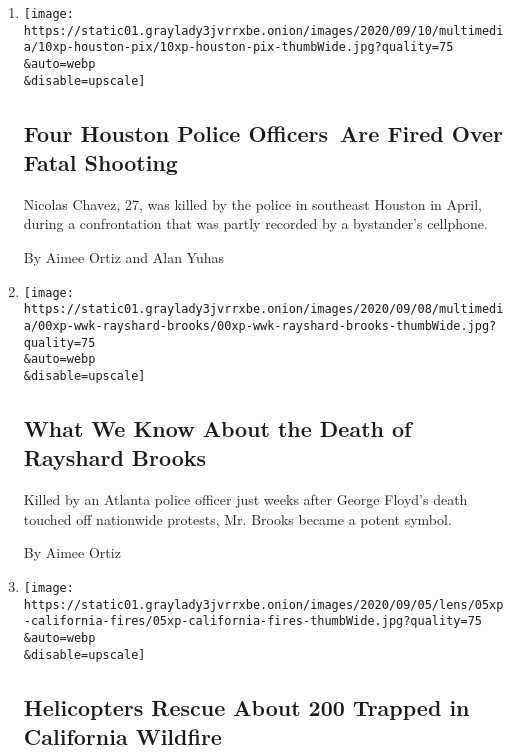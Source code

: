 \begin{enumerate}
\def\labelenumi{\arabic{enumi}.}
\item
  \href{/2020/09/10/us/nicholas-chavez-houston-police.html}{}

  \texttt{[image: https://static01.graylady3jvrrxbe.onion/images/2020/09/10/multimedia/10xp-houston-pix/10xp-houston-pix-thumbWide.jpg?quality=75\\\&auto=webp\\\&disable=upscale]}

  \hypertarget{four-houston-police-officers-are-fired-over-fatal-shooting}{%
  \subsection{Four Houston Police Officers~Are Fired Over Fatal
  Shooting}\label{four-houston-police-officers-are-fired-over-fatal-shooting}}

  Nicolas Chavez, 27, was killed by the police in southeast Houston in
  April, during a confrontation that was partly recorded by a
  bystander's cellphone.

  By Aimee Ortiz and Alan Yuhas
\item
  \href{/article/rayshard-brooks-what-we-know.html}{}

  \texttt{[image: https://static01.graylady3jvrrxbe.onion/images/2020/09/08/multimedia/00xp-wwk-rayshard-brooks/00xp-wwk-rayshard-brooks-thumbWide.jpg?quality=75\\\&auto=webp\\\&disable=upscale]}

  \hypertarget{what-we-know-about-the-death-of-rayshard-brooks}{%
  \subsection{What We Know About the Death of Rayshard
  Brooks}\label{what-we-know-about-the-death-of-rayshard-brooks}}

  Killed by an Atlanta police officer just weeks after George Floyd's
  death touched off nationwide protests, Mr. Brooks became a potent
  symbol.

  By Aimee Ortiz
\item
  \href{/2020/09/06/us/mammoth-pools-fires-california.html}{}

  \texttt{[image: https://static01.graylady3jvrrxbe.onion/images/2020/09/05/lens/05xp-california-fires/05xp-california-fires-thumbWide.jpg?quality=75\\\&auto=webp\\\&disable=upscale]}

  \hypertarget{helicopters-rescue-about-200-trapped-in-california-wildfire}{%
  \subsection{Helicopters Rescue About 200 Trapped in California
  Wildfire}\label{helicopters-rescue-about-200-trapped-in-california-wildfire}}


\end{enumerate}
